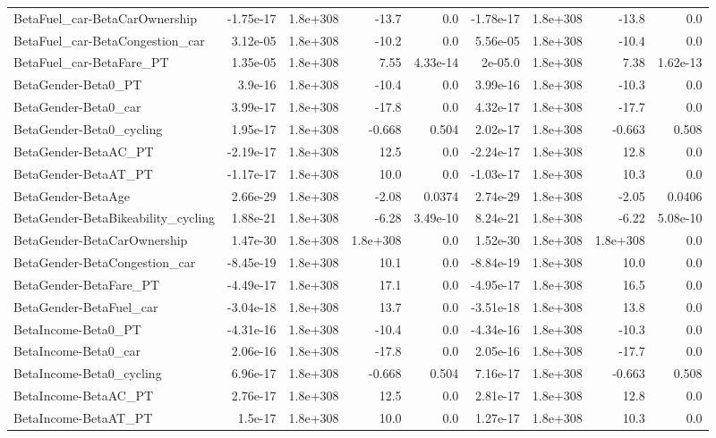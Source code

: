 \begin{tabular}{lrrrrrrrr}
BetaFuel_car-BetaCarOwnership & -1.75e-17 & 1.8e+308 & -13.7 & 0.0 & -1.78e-17 & 1.8e+308 & -13.8 & 0.0 \\
BetaFuel_car-BetaCongestion_car & 3.12e-05 & 1.8e+308 & -10.2 & 0.0 & 5.56e-05 & 1.8e+308 & -10.4 & 0.0 \\
BetaFuel_car-BetaFare_PT & 1.35e-05 & 1.8e+308 & 7.55 & 4.33e-14 & 2e-05.0 & 1.8e+308 & 7.38 & 1.62e-13 \\
BetaGender-Beta0_PT & 3.9e-16 & 1.8e+308 & -10.4 & 0.0 & 3.99e-16 & 1.8e+308 & -10.3 & 0.0 \\
BetaGender-Beta0_car & 3.99e-17 & 1.8e+308 & -17.8 & 0.0 & 4.32e-17 & 1.8e+308 & -17.7 & 0.0 \\
BetaGender-Beta0_cycling & 1.95e-17 & 1.8e+308 & -0.668 & 0.504 & 2.02e-17 & 1.8e+308 & -0.663 & 0.508 \\
BetaGender-BetaAC_PT & -2.19e-17 & 1.8e+308 & 12.5 & 0.0 & -2.24e-17 & 1.8e+308 & 12.8 & 0.0 \\
BetaGender-BetaAT_PT & -1.17e-17 & 1.8e+308 & 10.0 & 0.0 & -1.03e-17 & 1.8e+308 & 10.3 & 0.0 \\
BetaGender-BetaAge & 2.66e-29 & 1.8e+308 & -2.08 & 0.0374 & 2.74e-29 & 1.8e+308 & -2.05 & 0.0406 \\
BetaGender-BetaBikeability_cycling & 1.88e-21 & 1.8e+308 & -6.28 & 3.49e-10 & 8.24e-21 & 1.8e+308 & -6.22 & 5.08e-10 \\
BetaGender-BetaCarOwnership & 1.47e-30 & 1.8e+308 & 1.8e+308 & 0.0 & 1.52e-30 & 1.8e+308 & 1.8e+308 & 0.0 \\
BetaGender-BetaCongestion_car & -8.45e-19 & 1.8e+308 & 10.1 & 0.0 & -8.84e-19 & 1.8e+308 & 10.0 & 0.0 \\
BetaGender-BetaFare_PT & -4.49e-17 & 1.8e+308 & 17.1 & 0.0 & -4.95e-17 & 1.8e+308 & 16.5 & 0.0 \\
BetaGender-BetaFuel_car & -3.04e-18 & 1.8e+308 & 13.7 & 0.0 & -3.51e-18 & 1.8e+308 & 13.8 & 0.0 \\
BetaIncome-Beta0_PT & -4.31e-16 & 1.8e+308 & -10.4 & 0.0 & -4.34e-16 & 1.8e+308 & -10.3 & 0.0 \\
BetaIncome-Beta0_car & 2.06e-16 & 1.8e+308 & -17.8 & 0.0 & 2.05e-16 & 1.8e+308 & -17.7 & 0.0 \\
BetaIncome-Beta0_cycling & 6.96e-17 & 1.8e+308 & -0.668 & 0.504 & 7.16e-17 & 1.8e+308 & -0.663 & 0.508 \\
BetaIncome-BetaAC_PT & 2.76e-17 & 1.8e+308 & 12.5 & 0.0 & 2.81e-17 & 1.8e+308 & 12.8 & 0.0 \\
BetaIncome-BetaAT_PT & 1.5e-17 & 1.8e+308 & 10.0 & 0.0 & 1.27e-17 & 1.8e+308 & 10.3 & 0.0 \\

\end{tabular}
